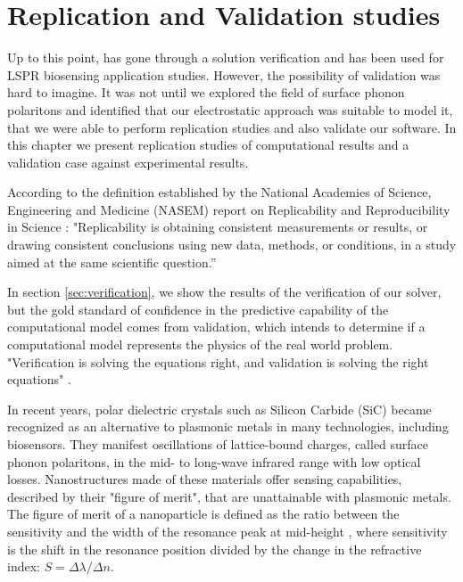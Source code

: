 
\chapter{Replication and Validation studies}

Up to this point, \pygbe has gone through a solution verification and has been used for 
LSPR biosensing application studies. However, the possibility of validation was hard to imagine. It was not
until we explored the field of surface phonon polaritons and identified that our electrostatic approach was suitable to model it, 
that we were able to perform replication studies and also validate our software. In this chapter we present replication 
studies of computational results and a validation case against experimental results. 

According to the definition established by the National Academies of Science, Engineering 
and Medicine (NASEM) report on Replicability and Reproducibility in Science \cite{NASEM2019}: "Replicability is obtaining 
consistent measurements or results, or drawing consistent conclusions using new data, methods, or conditions, in a
study aimed at the same scientific question.” 

In section \ref{sec:verification}, we show the results of the verification of our 
solver, but the gold standard of confidence in the predictive capability of the computational model comes from validation, which 
intends to determine if a computational model represents the physics of the real world problem. "Verification is solving the equations
right, and validation is solving the right equations" \cite{Roache1998}. 

In recent years, polar dielectric crystals such as Silicon Carbide (SiC) became recognized as an alternative to 
plasmonic metals in many technologies, including biosensors. They manifest oscillations of lattice-bound charges, called surface 
phonon polaritons, in the mid- to long-wave infrared range with low optical losses. Nanostructures made of these materials offer sensing 
capabilities, described by their "figure of merit", that are unattainable with plasmonic metals. The figure of merit of a nanoparticle
is defined as the ratio between the sensitivity and the width of the resonance peak at mid-height \cite{otte2012}, where 
sensitivity is the shift in the resonance position divided by the change in the refractive index: 
$S = \Delta \lambda / \Delta n$. 

